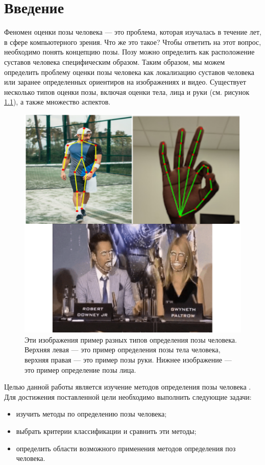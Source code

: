 
\chapter{Введение}

Феномен оценки позы человека --- это проблема, которая изучалась в течение лет, в сфере компьютерного зрения. Что же это такое? Чтобы ответить на этот вопрос, необходимо понять концепцию позы. Позу можно определить как расположение суставов человека специфическим образом. Таким образом, мы можем определить проблему оценки позы человека как локализацию суставов человека или заранее определенных ориентиров на изображениях и видео. Существует несколько типов оценки позы, включая оценки тела, лица и руки (см. рисунок \ref{img:human,hand,face}), а также множество аспектов.

\begin{figure}[ht!]
	\centering
	\includegraphics[width=0.85\linewidth]{assets/thefirst.png}
	\caption{Эти изображения пример разных типов определения позы человека. Верхняя левая --- это пример определения позы тела человека, верхняя правая --- это пример позы руки. Нижнее изображение --- это пример определение позы лица.}
	\label{img:human,hand,face}
\end{figure}


Целью данной работы является изучение методов определения позы человека \cite{guide-hpe}. Для достижения поставленной цели необходимо выполнить следующие задачи:
\begin{itemize}
	\item изучить методы по определению позы человека;
	\item выбрать критерии классификации и сравнить эти методы;
	\item определить области возможного применения методов определения поз человека.
\end{itemize}